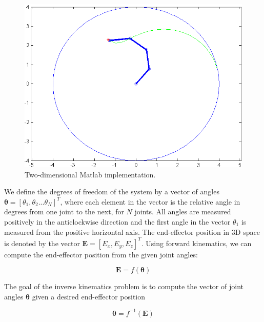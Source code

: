 \documentclass[paper=a4, fontsize=11pt]{scrartcl} %
\numberwithin{equation}{section} %
\numberwithin{figure}{section} %
\numberwithin{table}{section} %
\newcommand{\vect}[1]{\mathbf{#1}}
\newcommand{\params}{\boldsymbol{\theta}}
\begin{document}
\begin{figure}
\centering
\includegraphics[scale=0.6]{chainMatlab}
\caption{Two-dimensional Matlab implementation.}
\label{fig:Matlabpicture}
\end{figure}

We define the degrees of freedom of the system by a vector of angles $\params = [\theta_1, \theta_2...\theta_N]^T$, where each element in the vector is the relative angle in degrees from one joint to the next, for $N$ joints. All angles are measured positively in the anticlockwise direction and the first angle in the vector $\theta_1$ is measured from the positive horizontal axis. The end-effector position in 3D space is denoted by the vector 
$\vect{E} = [E_x, E_y, E_z]^T$. Using forward kinematics, we can compute the end-effector position from the given joint angles:

\begin{equation}
\vect{E} = f(\params)
\end{equation}

The goal of the inverse kinematics problem is to compute the vector of joint angles $\params$ given a desired end-effector position

\begin{equation}
\params = f^{-1}(\vect{E})
\end{equation}
\end{document}
